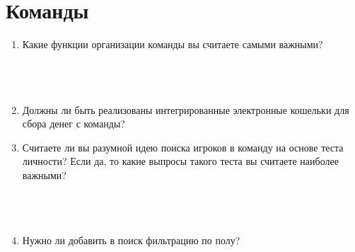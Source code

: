 \documentclass{article}
\newcommand{\red}[1]{\uline{\hspace*{1cm}\textcolor{white}{#1}\hspace*{1cm}}}
\begin{document}
  \section{Команды}
  \begin{enumerate}[label=\arabic*), resume]
    \item Какие функции организации команды вы считаете самыми важными?
      \vspace{.2cm} \\ \red{\hspace{10cm}}
      \vspace{.2cm} \\ \red{\hspace{10cm}}
      \vspace{.2cm} \\ \red{\hspace{10cm}}
      \vspace{.2cm} \\ \red{\hspace{10cm}}
    \item Должны ли быть реализованы интегрированные электронные кошельки для сбора денег с команды? \vspace{.2cm} \\ \red{\hspace{10cm}}
    \item Считаете ли вы разумной идею поиска игроков в команду на основе теста личности?
      Если да, то какие выпросы такого теста вы считаете наиболее важными?
      \vspace{.2cm} \\ \red{\hspace{10cm}}
      \vspace{.2cm} \\ \red{\hspace{10cm}}
      \vspace{.2cm} \\ \red{\hspace{10cm}}
      \vspace{.2cm} \\ \red{\hspace{10cm}}
    \item Нужно ли добавить в поиск фильтрацию по полу? \vspace{.2cm} \\ \red{\hspace{10cm}}
  \end{enumerate}
\end{document}
